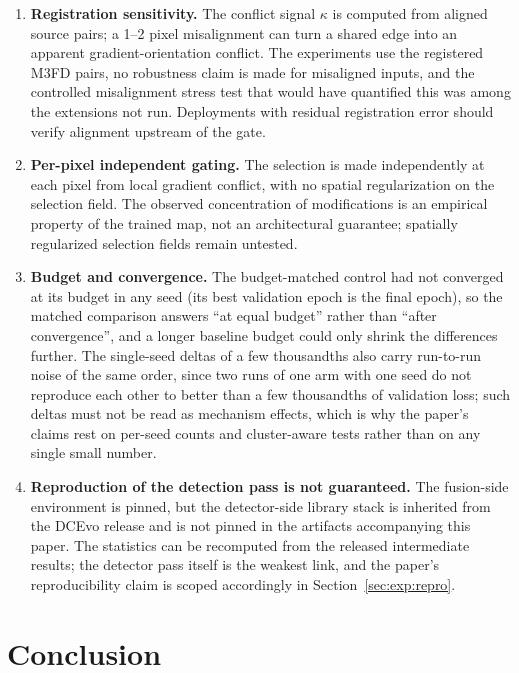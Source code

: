 \documentclass[pdflatex,sn-mathphys-num]{sn-jnl}
\theoremstyle{thmstyleone}%
\theoremstyle{thmstyletwo}%
\theoremstyle{thmstylethree}%
\begin{document}
\begin{enumerate}
\item \textbf{Registration sensitivity.} The conflict signal $\kappa$ is computed from aligned source pairs; a 1--2 pixel misalignment can turn a shared edge into an apparent gradient-orientation conflict. The experiments use the registered M3FD pairs, no robustness claim is made for misaligned inputs, and the controlled misalignment stress test that would have quantified this was among the extensions not run. Deployments with residual registration error should verify alignment upstream of the gate.

\item \textbf{Per-pixel independent gating.} The selection is made independently at each pixel from local gradient conflict, with no spatial regularization on the selection field. The observed concentration of modifications is an empirical property of the trained map, not an architectural guarantee; spatially regularized selection fields remain untested.

\item \textbf{Budget and convergence.} The budget-matched control had not converged at its budget in any seed (its best validation epoch is the final epoch), so the matched comparison answers ``at equal budget'' rather than ``after convergence'', and a longer baseline budget could only shrink the differences further. The single-seed deltas of a few thousandths also carry run-to-run noise of the same order, since two runs of one arm with one seed do not reproduce each other to better than a few thousandths of validation loss; such deltas must not be read as mechanism effects, which is why the paper's claims rest on per-seed counts and cluster-aware tests rather than on any single small number.

\item \textbf{Reproduction of the detection pass is not guaranteed.} The fusion-side environment is pinned, but the detector-side library stack is inherited from the DCEvo release and is not pinned in the artifacts accompanying this paper. The statistics can be recomputed from the released intermediate results; the detector pass itself is the weakest link, and the paper's reproducibility claim is scoped accordingly in Section~\ref{sec:exp:repro}.
\end{enumerate}

\section{Conclusion}\label{sec:conclusion}
\end{document}
